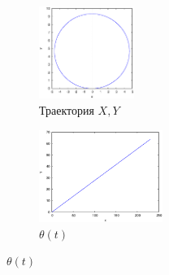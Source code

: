 \begin{figure}
    \centering
    \begin{subfigure}[t]{0.3\textwidth}
        \centering
        \includegraphics[width=\linewidth, height=30mm]{pic/_old_sol__1_0_1__0__230__1e2_trajectory}
        \caption{Траектория $X, Y$}
        \label{fig:_old_sol__1_0_1__0__230__1e2_trajectory}
    \end{subfigure}
    \begin{subfigure}[t]{0.3\textwidth}
        \centering
        \includegraphics[width=\linewidth, height=30mm]{pic/_old_sol__1_0_1__0__230__1e2_theta}
        \caption{$\theta(t)$}
        \label{fig:_old_sol__1_0_1__0__230__1e2_theta}
    \end{subfigure}
    \vspace{12pt}
    

\end{figure}
